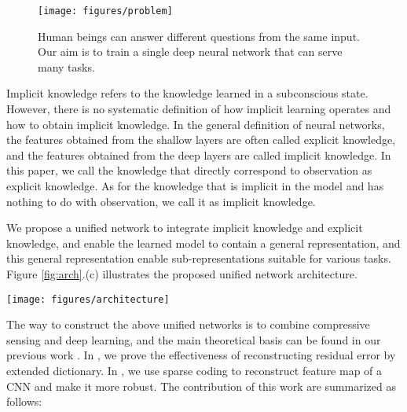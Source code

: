 \documentclass[10pt,twocolumn,letterpaper]{article}
\begin{document}
\begin{figure}[h]
	\begin{center}
		\texttt{[image: figures/problem]}
	\end{center}
	\caption{Human beings can answer different questions from the same input. Our aim is to train a single deep neural network that can serve many tasks.}
	\label{fig:prob}
	\vspace{-6mm}
\end{figure}

Implicit knowledge refers to the knowledge learned in a subconscious state. However, there is no systematic definition of how implicit learning operates and how to obtain implicit knowledge. In the general definition of neural networks, the features obtained from the shallow layers are often called explicit knowledge, and the features obtained from the deep layers are called implicit knowledge. In this paper, we call the knowledge that directly correspond to observation as explicit knowledge. As for the knowledge that is implicit in the model and has nothing to do with observation, we call it as implicit knowledge.

We propose a unified network to integrate implicit knowledge and explicit knowledge, and enable the learned model to contain a general representation, and this general representation enable sub-representations suitable for various tasks. Figure \ref{fig:arch}.(c) illustrates the proposed unified network architecture.

\begin{figure*}[t]
	\begin{center}
		\texttt{[image: figures/architecture]}
	\end{center}
	\caption{Multi-purpose NN architectures. (a) distinct models for distinct tasks; (b) shared backbone, different heads for different tasks; and (c) our proposed unified network: one representation with explicit knowledge and implicit knowledge for serving multiple tasks.}
	\vspace{-5mm}
	\label{fig:arch}
\end{figure*}

The way to construct the above unified networks is to combine compressive sensing and deep learning, and the main theoretical basis can be found in our previous work \cite{wang2016robust, wang2017recognition, wang2020sound}. In \cite{wang2016robust}, we prove the effectiveness of reconstructing residual error by extended dictionary. In \cite{wang2017recognition, wang2020sound}, we use sparse coding to reconstruct feature map of a CNN and make it more robust. The contribution of this work are summarized as follows:
\vspace{-2mm}
\end{document}

